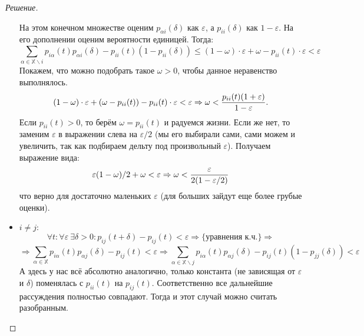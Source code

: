 \documentclass[12pt,a4paper]{extarticle}
\newcommand{\X}{\mathbb{X}}
\newcommand{\e}{\varepsilon}
\begin{document}
\begin{proof}[Решение]
\begin{itemize}
			На этом конечном множестве оценим $p_{\alpha i}(\delta)$ как $\e$, а $p_{ii}(\delta)$ как $1- \e$. На его дополнении оценим вероятности единицей.
			Тогда:
			\[
				\sum_{\alpha \in \X \backslash i} p_{i\alpha}(t) p_{\alpha i}(\delta) - p_{ii}(t)(1-p_{ii}(\delta)) \leq (1 - \omega) \cdot \e + \omega - p_{ii}(t) \cdot\e < \e
			\]
			Покажем, что можно подобрать такое $\omega > 0$, чтобы данное неравенство выполнялось.
			\[
				(1 - \omega) \cdot \e + (\omega - p_{ii}(t))- p_{ii}(t) \cdot\e  < \e \Rightarrow \omega < {p_{ii}(t)(1 + \e) \over {1-\e}}.
			\]
			Если $p_{ii}(t) > 0$, то берём $\omega = p_{ii}(t)$ и радуемся жизни. Если же нет, то заменим $\e$ в выражении слева на $\e/2$ (мы его выбирали сами, сами можем и увеличить, так как подбираем дельту под произвольный $\e$). Получаем выражение вида:
			\[
				\e(1-\omega)/2 +\omega < \e \Rightarrow \omega < {\e \over 2(1 - \e / 2)}
			\]
			что верно для достаточно маленьких $\e$ (для больших зайдут еще более грубые оценки).
			\\
			\item $i \neq j$:
			\[
				\forall t: \forall \e ~\exists \delta > 0 : p_{ij}(t + \delta) - p_{ij}(t) < \e \Rightarrow \{\text{уравнения к.ч.}\} \Rightarrow
			\]
			\[
				\Rightarrow \sum_{\alpha \in \X} p_{i\alpha}(t) p_{\alpha j}(\delta) - p_{ij}(t) < \e
				\Rightarrow
				\sum_{\alpha \in \X \backslash j} p_{i\alpha}(t) p_{\alpha j}(\delta) - p_{ij}(t)(1 - p_{jj}(\delta)) < \e
			\]
			А здесь у нас всё абсолютно аналогично, только константа (не зависящая от $\e$ и $\delta$) поменялась с $p_{ii}(t)$ на $p_{ij}(t)$. Соответственно все дальнейшие рассуждения полностью совпадают. Тогда и этот случай можно считать разобранным.
		\end{itemize}
	
	\end{proof}
	
	
	
	
	
	
	
	
	
	
	\newpage
	
\end{document}
